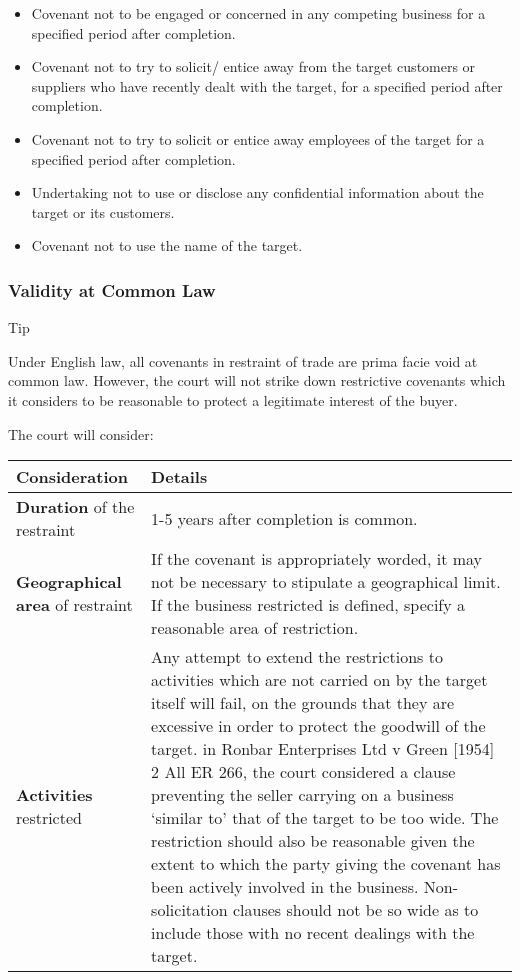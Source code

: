 \documentclass[
]{article}
\providecommand{\tightlist}{%
  \setlength{\itemsep}{0pt}\setlength{\parskip}{0pt}}
\newenvironment{env-8073ffbe-6656-43d2-bf4d-97e604cb2369}
{
    \savenotes\tcolorbox[blanker,breakable,left=5pt,borderline west={2pt}{-4pt}{cyan}]
}
{
    \endtcolorbox\spewnotes
}
\begin{document}
\begin{itemize}
\tightlist
\item
  Covenant not to be engaged or concerned in any competing business for
  a specified period after completion.
\item
  Covenant not to try to solicit/ entice away from the target customers
  or suppliers who have recently dealt with the target, for a specified
  period after completion.
\item
  Covenant not to try to solicit or entice away employees of the target
  for a specified period after completion.
\item
  Undertaking not to use or disclose any confidential information about
  the target or its customers.
\item
  Covenant not to use the name of the target.
\end{itemize}

\hypertarget{validity-at-common-law}{%
\subsubsection{Validity at Common Law}\label{validity-at-common-law}}

\begin{env-8073ffbe-6656-43d2-bf4d-97e604cb2369}

Tip

Under English law, all covenants in restraint of trade are prima facie
void at common law. However, the court will not strike down restrictive
covenants which it considers to be reasonable to protect a legitimate
interest of the buyer.

\end{env-8073ffbe-6656-43d2-bf4d-97e604cb2369}

The court will consider:

\begin{longtable}[]{@{}ll@{}}
\toprule()
Consideration & Details \\
\midrule()
\endhead
\textbf{Duration} of the restraint & 1-5 years after completion is
common. \\
\textbf{Geographical area} of restraint & If the covenant is
appropriately worded, it may not be necessary to stipulate a
geographical limit. If the business restricted is defined, specify a
reasonable area of restriction. \\
\textbf{Activities} restricted & Any attempt to extend the restrictions
to activities which are not carried on by the target itself will fail,
on the grounds that they are excessive in order to protect the goodwill
of the target. in Ronbar Enterprises Ltd v Green {[}1954{]} 2 All ER
266, the court considered a clause preventing the seller carrying on a
business `similar to' that of the target to be too wide. The restriction
should also be reasonable given the extent to which the party giving the
covenant has been actively involved in the business. Non-solicitation
clauses should not be so wide as to include those with no recent
dealings with the target. \\
\bottomrule()
\end{longtable}
\end{document}
